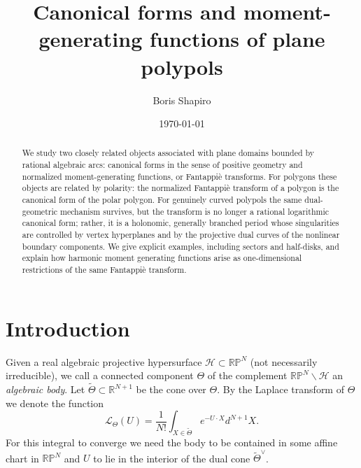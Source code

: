 \documentclass[10pt,a4paper,reqno]{amsart}
\newcommand {\bR} {\mathbb R}
\newcommand {\bRP} {\mathbb {RP}}
\newcommand {\HH} {\mathcal H}
\newcommand{\LL}{\mathcal L}
\theoremstyle{plain}
\theoremstyle{definition}
\begin{document}

             \title [Canonical forms and moment-generating functions of plane polypols]
             {Canonical forms and moment-generating functions of plane polypols}
          


\author[B.~Shapiro]{Boris Shapiro}
\address{Department of Mathematics, Stockholm University, SE-106 91, Stockholm,
            Sweden}



\date{\today}

\begin{abstract}
We study two closely related objects associated with plane domains bounded by
rational algebraic arcs: canonical forms in the sense of positive geometry and
normalized moment-generating functions, or Fantappi\`e transforms.  For polygons
these objects are related by polarity: the normalized Fantappi\`e transform of a
polygon is the canonical form of the polar polygon.  For genuinely curved
polypols the same dual-geometric mechanism survives, but the transform is no
longer a rational logarithmic canonical form; rather, it is a holonomic,
generally branched period whose singularities are controlled by vertex
hyperplanes and by the projective dual curves of the nonlinear boundary
components.  We give explicit examples, including sectors and half-disks, and
explain how harmonic moment generating functions arise as one-dimensional
restrictions of the same Fantappi\`e transform.
\end{abstract}

\maketitle


\section{Introduction}
\label{sec:int}

 Given a real algebraic projective hypersurface $\HH\subset \bRP^N$ (not necessarily irreducible), we call a connected component $\Theta$ of the complement $\bRP^N\backslash \HH$ an \emph{algebraic body}. Let $\widetilde \Theta\subset \bR^{N+1}$ be the cone over $\Theta$. By the Laplace transform of $\Theta$ we denote the function
 \begin{equation}\label{eq:Laplace}
\LL_\Theta(U)=\frac{1}{N!}\int_{X\in \widetilde \Theta}e^{-U\cdot X}d^{N+1}X.
 \end{equation}
 For this integral to converge we need the body to be contained in some affine chart in $\bRP^N$ and $U$ to lie in the interior of the dual cone $\widetilde \Theta^{\vee}$. 
 
\end{document}
